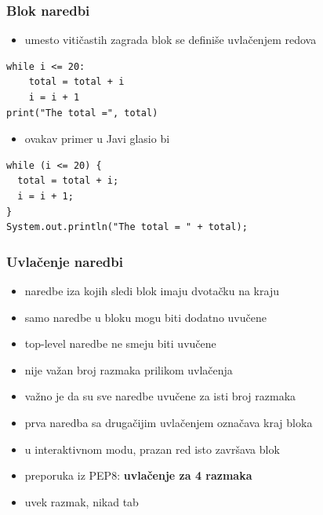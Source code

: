 \documentclass[compress]{beamer}
\begin{document}
\begin{frame}[fragile]
\frametitle{Blok naredbi}
\begin{itemize}
  \item umesto vitičastih zagrada blok se definiše uvlačenjem redova
\end{itemize}
\begin{verbatim}
while i <= 20:
    total = total + i
    i = i + 1
print("The total =", total)
\end{verbatim}
\begin{itemize}
  \item ovakav primer u Javi glasio bi
\end{itemize}
\begin{verbatim}
while (i <= 20) {
  total = total + i;
  i = i + 1;
}
System.out.println("The total = " + total);
\end{verbatim}  
\end{frame}
  
\begin{frame}[fragile]
\frametitle{Uvlačenje naredbi}
\begin{itemize}
  \item naredbe iza kojih sledi blok imaju dvotačku na kraju
  \item samo naredbe u bloku mogu biti dodatno uvučene
  \item top-level naredbe ne smeju biti uvučene
\end{itemize}
\begin{itemize}
  \item nije važan broj razmaka prilikom uvlačenja
  \item važno je da su sve naredbe uvučene za isti broj razmaka
  \item prva naredba sa drugačijim uvlačenjem označava kraj bloka
  \item u interaktivnom modu, prazan red isto završava blok
\end{itemize}
\begin{itemize}
  \item preporuka iz PEP8: \textbf{uvlačenje za 4 razmaka}
  \item uvek razmak, nikad tab
\end{itemize}
\end{frame}
\end{document}
